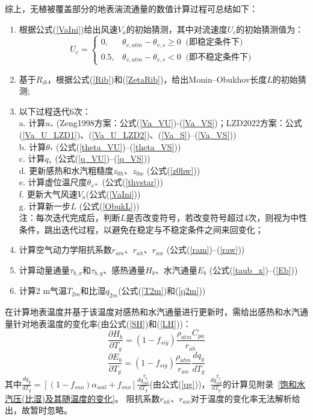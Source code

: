 综上，无植被覆盖部分的地表湍流通量的数值计算过程可总结如下：
\begin{enumerate}
     \item 根据公式(\ref{VaIni})给出风速$V_{a}$的初始猜测，其中对流速度$U_c$的初始猜测值为：
       \begin{equation}
          U_{c}= \begin{cases}
           0, & \theta_{v, atm}-\theta_{v, s} \geq 0\ \text { (即稳定条件下) } \\ 
           0.5, & \theta_{v, atm}-\theta_{v, s}<0\ \text { (即不稳定条件下) }
          \end{cases}
       \end{equation}
     \item 基于$R_{ib}$，根据公式(\ref{Rib})和(\ref{ZetaRib})，给出Monin--Obukhov长度$L$的初始猜测;
     \item 以下过程迭代6次：\\
     a. 计算$u_\ast$ (Zeng1998方案：公式(\ref{Va_VU})-(\ref{Va_VS})；LZD2022方案：公式(\ref{Va_U_LZD1})、(\ref{Va_U_LZD2})、(\ref{Va_S})--(\ref{Va_VS})) \\
     b. 计算$\theta_\ast$ (公式(\ref{theta_VU})--(\ref{theta_VS})) \\
     c. 计算$q_\ast$ (公式(\ref{q_VU})--(\ref{q_VS})) \\
     d. 更新感热和水汽粗糙度$z_{0h}$、$z_{0w}$ (公式(\ref{z0hw})) \\
     e. 计算虚位温尺度$\theta_{v\ast}$ (公式(\ref{thvstar})) \\
     f. 更新大气风速$V_a$(公式(\ref{VaIni})) \\
     g. 计算新一步$L$ (公式(\ref{ObukL})) \\
     注：每次迭代完成后，判断$L$是否改变符号，若改变符号超过4次，则视为中性条件，跳出迭代过程，以避免在稳定与不稳定条件之间来回变化；
     \item 计算空气动力学阻抗系数$r_{am}$、$r_{ah}$、$r_{aw}$ (公式(\ref{ram})--(\ref{raw}))
     \item 计算动量通量$\tau_{b,x}$和$\tau_{b,y}$、感热通量$H_b$、水汽通量$E_b$ (公式(\ref{taub_x})--(\ref{Eb}))
     \item 计算2 m气温$T_{2m}$和比湿$q_{2m}$(公式(\ref{T2m})和(\ref{q2m}))
 \end{enumerate}

 在计算地表温度并基于该温度对感热和水汽通量进行更新时，需给出感热和水汽通量针对地表温度的变化率(由公式(\ref{SH})和(\ref{LH}))：
\begin{equation}
     \frac{\partial H_{b}}{\partial T_{g}}=\left(1-f_{sig}\right) \frac{\rho_{atm} C_{p a}}{r_{a h}}
\end{equation}
\begin{equation}
     \frac{\partial E_{b}}{\partial T_{g}}=\left(1-f_{sig}\right) \frac{\rho_{atm}}{r_{a w}} \frac{d q_{g}}{d T_{g}}
\end{equation}
其中$\frac{dq_g}{dT_g}=\left[\left(1-f_{sno}\right)\alpha_{soil}+f_{sno}\right]\frac{dq_{sat}^{T_g}}{dT_g}$(由公式(\ref{qg}))，$\frac{dq_{sat}^{T_g}}{dT_g}$的计算见附录~\ref{饱和水汽压(比湿)及其随温度的变化}。
阻抗系数$r_{ah}$、$r_{aw}$对于温度的变化率无法解析给出，故暂时忽略。


